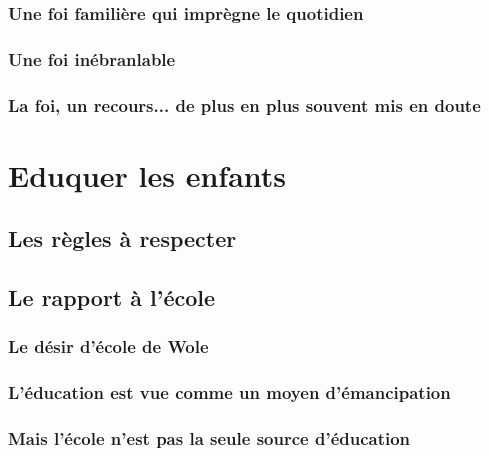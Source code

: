 \documentclass[a4paper, 11pt, hidelinks]{article}
\begin{document}
\subsubsection{Une foi familière qui imprègne le quotidien}





\subsubsection{Une foi inébranlable}





\subsubsection{La foi, un recours... de plus en plus souvent mis en doute}





\section{Eduquer les enfants}

\subsection{Les règles à respecter}





\subsection{Le rapport à l'école}

\subsubsection{Le désir d'école de Wole}




\subsubsection{L'éducation est vue comme un moyen d'émancipation}





\subsubsection{Mais l'école n'est pas la seule source d'éducation}
\end{document}
